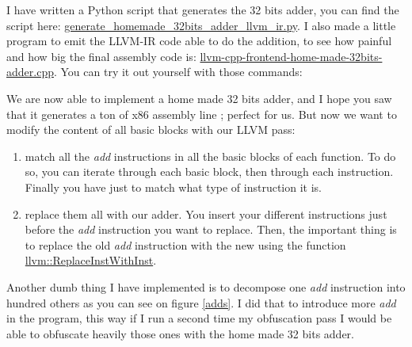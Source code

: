 \documentclass[a4paper, 11pt, notitlepage]{report}
\begin{document}
I have written a Python script that generates the 32 bits adder, you can find the script here: \href{https://github.com/0vercl0k/stuffz/blob/master/llvm-funz/generate_homemade_32bits_adder_llvm_ir.py}{generate\_homemade\_32bits\_adder\_llvm\_ir.py}. I also made a little program to emit the LLVM-IR code able to do the addition, to see how painful and how big the final assembly code is: \href{https://github.com/0vercl0k/stuffz/blob/master/llvm-funz/llvm-cpp-frontend-home-made-32bits-adder.cpp}{llvm-cpp-frontend-home-made-32bits-adder.cpp}. You can try it out yourself with those commands:

We are now able to implement a home made 32 bits adder, and I hope you saw that it generates a ton of x86 assembly line ; perfect for us. But now we want to modify the content of all basic blocks with our LLVM pass:
\begin{enumerate}
	\item match all the \textit{add} instructions in all the basic blocks of each function. To do so, you can iterate through each basic block, then through each instruction. Finally you have just to match what type of instruction it is.
	\item replace them all with our adder. You insert your different instructions just before the \textit{add} instruction you want to replace. Then, the important thing is to replace the old \textit{add} instruction with the new using the function \href{https://llvm.org/viewvc/llvm-project/llvm/trunk/include/llvm/Transforms/Utils/BasicBlockUtils.h?view=markup}{llvm::ReplaceInstWithInst}.
\end{enumerate}

Another dumb thing I have implemented is to decompose one \textit{add} instruction into hundred others as you can see on figure \ref{adds}. I did that to introduce more \textit{add} in the program, this way if I run a second time my obfuscation pass I would be able to obfuscate heavily those ones with the home made 32 bits adder.
\end{document}
